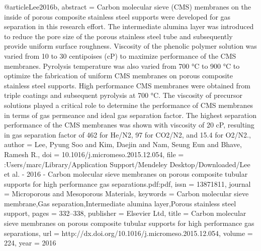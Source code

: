 @article{Lee2016b,
abstract = {Carbon molecular sieve (CMS) membranes on the inside of porous composite stainless steel supports were developed for gas separation in this research effort. The intermediate alumina layer was introduced to reduce the pore size of the porous stainless steel tube and subsequently provide uniform surface roughness. Viscosity of the phenolic polymer solution was varied from 10 to 30 centipoises (cP) to maximize performance of the CMS membranes. Pyrolysis temperature was also varied from 700 °C to 900 °C to optimize the fabrication of uniform CMS membranes on porous composite stainless steel supports. High performance CMS membranes were obtained from triple coatings and subsequent pyrolysis at 700 °C. The viscosity of precursor solutions played a critical role to determine the performance of CMS membranes in terms of gas permeance and ideal gas separation factor. The highest separation performance of the CMS membranes was shown with viscosity of 20 cP, resulting in gas separation factor of 462 for He/N2, 97 for CO2/N2, and 15.4 for O2/N2.},
author = {Lee, Pyung Soo and Kim, Daejin and Nam, Seung Eun and Bhave, Ramesh R.},
doi = {10.1016/j.micromeso.2015.12.054},
file = {:Users/marc/Library/Application Support/Mendeley Desktop/Downloaded/Lee et al. - 2016 - Carbon molecular sieve membranes on porous composite tubular supports for high performance gas separations.pdf:pdf},
issn = {13871811},
journal = {Microporous and Mesoporous Materials},
keywords = {Carbon molecular sieve membrane,Gas separation,Intermediate alumina layer,Porous stainless steel support},
pages = {332--338},
publisher = {Elsevier Ltd},
title = {{Carbon molecular sieve membranes on porous composite tubular supports for high performance gas separations}},
url = {http://dx.doi.org/10.1016/j.micromeso.2015.12.054},
volume = {224},
year = {2016}
}

